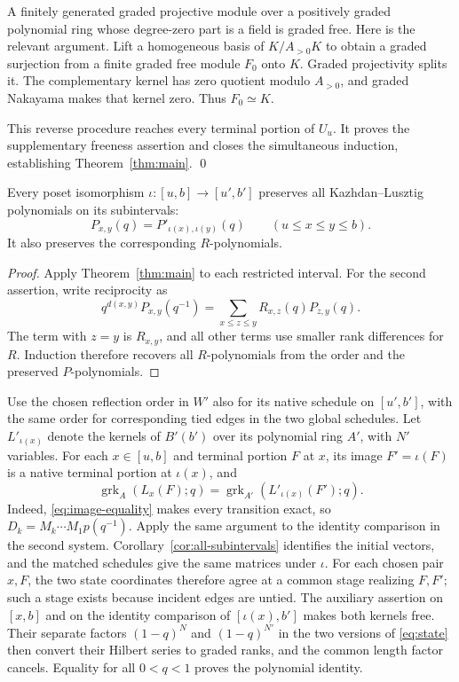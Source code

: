 A finitely generated graded projective module over a positively
graded polynomial ring whose degree-zero part is a field is graded
free. Here is the relevant argument.
Lift a homogeneous basis of \(K/A_{>0}K\) to obtain a graded
surjection from a finite graded free module \(F_0\) onto \(K\).
Graded projectivity splits it.
The complementary kernel has zero quotient modulo \(A_{>0}\),
and graded Nakayama makes that kernel zero.
Thus \(F_0\simeq K\).

This reverse procedure reaches every terminal portion of \(U_u\).
It proves the supplementary freeness assertion and closes the
simultaneous induction, establishing Theorem~\ref{thm:main}.
\qed

\begin{corollary}\label{cor:all-subintervals}
Every poset isomorphism \(\iota:[u,b]\to[u',b']\) preserves all
Kazhdan--Lusztig polynomials on its subintervals:
\[
 P_{x,y}(q)=P'_{\iota(x),\iota(y)}(q)
 \qquad(u\le x\le y\le b).
\]
It also preserves the corresponding \(R\)-polynomials.
\end{corollary}
\begin{proof}
Apply Theorem~\ref{thm:main} to each restricted interval.
For the second assertion, write reciprocity as
\[
 q^{d(x,y)}P_{x,y}(q^{-1})
 =\sum_{x\le z\le y}R_{x,z}(q)P_{z,y}(q).
\]
The term with \(z=y\) is \(R_{x,y}\), and all other terms use smaller
rank differences for \(R\).
Induction therefore recovers all \(R\)-polynomials from the
order and the preserved \(P\)-polynomials.
\end{proof}

\begin{remark}\label{rem:terminal-ranks}
Use the chosen reflection order in \(W'\) also for its native schedule on
\([u',b']\), with the same order for corresponding tied edges in the two
global schedules. Let \(L'_{\iota(x)}\) denote the kernels of \(B'(b')\)
over its polynomial ring \(A'\), with \(N'\) variables. For each
\(x\in[u,b]\) and terminal
portion \(F\) at \(x\), its image \(F'=\iota(F)\) is a native terminal
portion at \(\iota(x)\), and
\[
 \operatorname{grk}_A(L_x(F);q)
 =\operatorname{grk}_{A'}(L'_{\iota(x)}(F');q).
\]
Indeed, \eqref{eq:image-equality} makes every transition exact, so
\(D_k=M_k\cdots M_1p(q^{-1})\). Apply the same argument to the identity
comparison in the second system. Corollary~\ref{cor:all-subintervals}
identifies the initial vectors, and the matched schedules give the same
matrices under \(\iota\). For each chosen pair \(x,F\), the two state coordinates therefore
agree at a common stage realizing \(F,F'\); such a stage exists because
incident edges are untied. The auxiliary assertion on \([x,b]\) and on
the identity comparison of \([\iota(x),b']\) makes both kernels free.
Their separate factors \((1-q)^N\) and \((1-q)^{N'}\) in the two versions of \eqref{eq:state}
then convert their Hilbert series to graded ranks, and the common length
factor cancels. Equality for all \(0<q<1\) proves the polynomial identity.
\end{remark}
